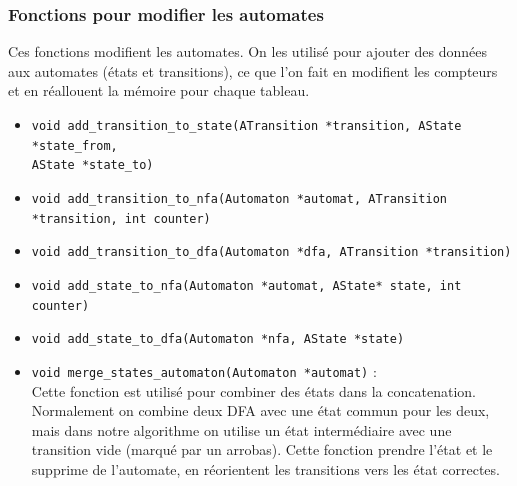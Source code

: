 \documentclass[12pt]{article}
\begin{document}
\subsubsection{Fonctions pour modifier les automates}
Ces fonctions modifient les automates. On les utilisé pour ajouter des données aux automates (états et transitions), ce que l'on fait en modifient les compteurs et en réallouent la mémoire pour chaque tableau. 
\begin{itemize}
  \item \lstinline|void add_transition_to_state(ATransition *transition, AState *state_from,|\\
  \lstinline|AState *state_to)|
  \item \lstinline|void add_transition_to_nfa(Automaton *automat, ATransition *transition, int counter)|
  \item \lstinline|void add_transition_to_dfa(Automaton *dfa, ATransition *transition)|
  \item \lstinline|void add_state_to_nfa(Automaton *automat, AState* state, int counter)|
  \item \lstinline|void add_state_to_dfa(Automaton *nfa, AState *state)|
  \item \lstinline|void merge_states_automaton(Automaton *automat)| : \\
  Cette fonction est utilisé pour combiner des états dans la concatenation. Normalement on combine deux DFA avec une état commun pour les deux, mais dans notre algorithme on utilise un état intermédiaire avec une transition vide (marqué par un arrobas). Cette fonction prendre l'état et le supprime de l'automate, en réorientent les transitions vers les état correctes.
\end{itemize}
\end{document}
